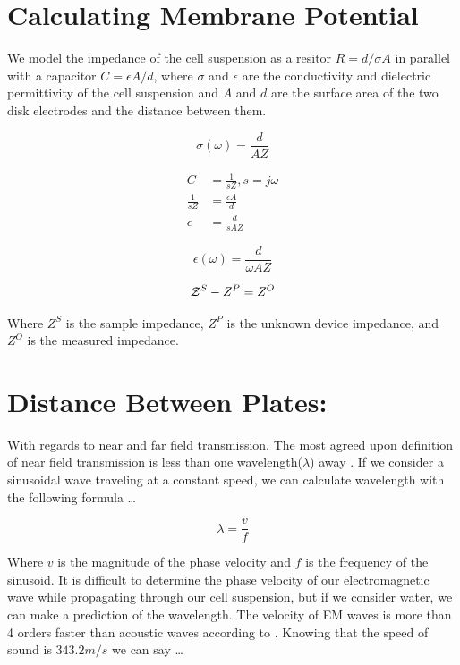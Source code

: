 \documentclass[journal]{IEEEtran}
\begin{document}
\section{Calculating Membrane Potential}
We model the impedance of the cell suspension as a resitor $R = d/\sigma A$ in parallel with a capacitor $C = \epsilon A/d$, where $\sigma$ and $\epsilon$ are the conductivity and dielectric permittivity of the cell suspension and $A$ and $d$ are the surface area of the two disk electrodes and the distance between them. 

\begin{equation}
\label{conductivity}
\sigma(\omega) = \frac{d}{AZ}
\end{equation}

\begin{align*}
C &= \frac{1}{sZ},s=j\omega \\
\frac{1}{sZ} &= \frac{\epsilon A}{d} \\
\epsilon &= \frac{d}{sAZ}
\end{align*}

\begin{equation}
\label{permittivity}
\epsilon(\omega) = \frac{d}{\omega AZ}
\end{equation}

\begin{equation}
\mathcal Z^S-Z^P = Z^O \\
\end{equation}

Where $Z^S$ is the sample impedance, $Z^P$ is the unknown device impedance, and $Z^O$ is the measured impedance. \\

\section{Distance Between Plates:}
With regards to near and far field transmission. The most agreed upon definition of near field transmission is less than one wavelength($\lambda$) away \cite{near-far-em}. If we consider a sinusoidal wave traveling at a constant speed, we can calculate wavelength with the following formula \ldots

\begin{equation}
\label{wavelength}
\lambda = \frac{v}{f}
\end{equation}

Where $v$ is the magnitude of the phase velocity and $f$ is the frequency of the sinusoid. It is difficult to determine the phase velocity of our electromagnetic wave while propagating through our cell suspension, but if we consider water, we can make a prediction of the wavelength. The velocity of EM waves is more than 4 orders faster than acoustic waves according to \cite{wave-propagation-water}. Knowing that the speed of sound is $343.2 m/s$ we can say \ldots
\end{document}
